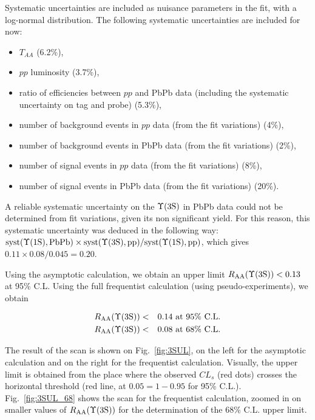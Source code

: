 Systematic uncertainties are included as nuisance parameters in the fit, with a log-normal distribution. The following systematic uncertainties are included for now:

\begin{itemize}
\item $T_{AA}$ (6.2\%),
\item  $pp$ luminosity (3.7\%),
\item ratio of efficiencies between  $pp$ and PbPb data (including the systematic uncertainty on tag and probe) (5.3\%),
\item number of background events in  $pp$ data (from the fit variations) (4\%),
\item number of background events in PbPb data (from the fit variations) (2\%),
\item number of signal events in  $pp$ data (from the fit variations) (8\%),
\item number of signal events in PbPb data (from the fit variations) (20\%).
\end{itemize}


A reliable systematic uncertainty on the $\Upsilon\mathrm{(3S)}$ in PbPb data could not be determined from fit variations, given its non significant yield. For this reason,
this systematic uncertainty was deduced in the following way: 
$\textrm{syst} (\Upsilon\mathrm{(1S)}, \textrm{PbPb}) \times \textrm{syst} (\Upsilon\mathrm{(3S)}, \textrm{pp}) / \textrm{syst} (\Upsilon\mathrm{(1S)}, \textrm{pp})$, which gives $0.11 \times 0.08/0.045 = 0.20$.

Using the asymptotic calculation, we obtain an upper limit $R_{\rm AA}(\Upsilon\mathrm{(3S)})<0.13$ at 95\% C.L. Using the full frequentist calculation
(using pseudo-experiments), we obtain

\begin{eqnarray*}
  R_{\rm AA}(\Upsilon\mathrm{(3S)}) &<& 0.14 \text{   at 95\% C.L.}\\ \nonumber
  R_{\rm AA}(\Upsilon\mathrm{(3S)}) &<& 0.08 \text{   at 68\% C.L.} \nonumber
\end{eqnarray*}


The result of the scan is shown on Fig.~\ref{fig:3SUL}, on the left for the asymptotic calculation and on the right for the frequentist
calculation. Visually, the upper limit is obtained from the place where the 
observed $CL_s$ (red dots) crosses the horizontal threshold (red line, at $0.05 = 1-0.95$ for 95\% C.L.). Fig.~\ref{fig:3SUL_68} shows the scan for the frequentist
calculation, zoomed in on smaller values of $R_{\rm AA}(\Upsilon\mathrm{(3S)})$ for the determination of the 68\% C.L. upper limit.


